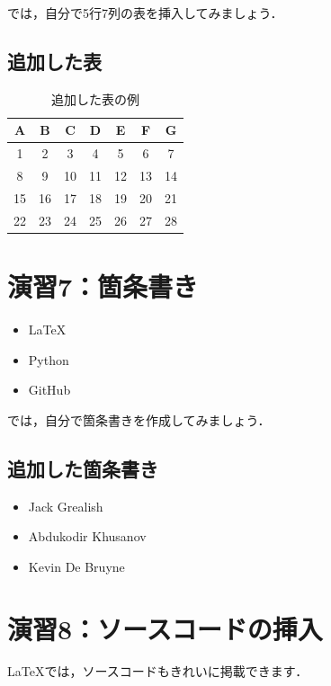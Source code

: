 \documentclass[a4paper,twocolumn]{jsarticle}
\begin{document}
では，自分で5行7列の表を挿入してみましょう．


\subsection*{追加した表}
\begin{table}[htbp]
    \centering
    \begin{tabular}{|c|c|c|c|c|c|c|}
        \hline
        A & B & C & D & E & F & G \\
        \hline
        1 & 2 & 3 & 4 & 5 & 6 & 7 \\
        8 & 9 & 10 & 11 & 12 & 13 & 14 \\
        15 & 16 & 17 & 18 & 19 & 20 & 21 \\
        22 & 23 & 24 & 25 & 26 & 27 & 28 \\
        \hline
    \end{tabular}
    \caption{追加した表の例}
    \label{tab:practice2}
\end{table}


\section*{演習7：箇条書き}
\begin{itemize}
    \item LaTeX
    \item Python
    \item GitHub
\end{itemize}

では，自分で箇条書きを作成してみましょう．


\subsection*{追加した箇条書き}
\begin{itemize}
    \item Jack Grealish
    \item Abdukodir Khusanov
    \item Kevin De Bruyne
\end{itemize}

\section*{演習8：ソースコードの挿入}
LaTeXでは，ソースコードもきれいに掲載できます．
\end{document}
